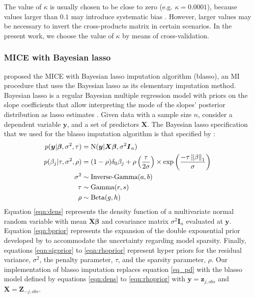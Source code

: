 	The value of $\kappa$ is usually chosen to be close to zero (e.g. $\kappa = 0.0001$), because values larger than $0.1$ 
	may introduce systematic bias \citep[p. 68]{vanBuuren:2018}.
	However, larger values may be necessary to invert the cross-products matrix in certain scenarios.
	In the present work, we choose the value of $\kappa$ by means of cross-validation.

\subsubsection{MICE with Bayesian lasso}
	\cite{zhaoLong:2016} proposed the MICE with Bayesian lasso imputation algorithm (blasso), an MI procedure that uses the Bayesian lasso as its elementary imputation method.
	Bayesian lasso is a regular Bayesian multiple regression model with priors on the slope coefficients 
	that allow interpreting the mode of the slopes' posterior distribution as lasso estimates 
	\citep{parkCasella:2008, hans:2009}.
	Given data with a sample size $n$, consider a dependent variable $\bm{y}$, and a set of predictors $\bm{X}$.
	The Bayesian lasso specification that we used for the blasso imputation algorithm is that specified 
	by \cite{hans:2010}:
%
	\begin{align}
		p(\bm{y}|\bm{\beta}, \sigma^2, \tau) &= \textrm{N}(\bm{y}|\bm{X\beta}, \sigma^2\bm{I}_n) \label{eqn:dens} \\
		p(\beta_j|\tau, \sigma^2, \rho) &= 
			(1 - \rho) \delta_0 \beta_j +
			\rho \left( \frac{\tau}{2\sigma} \right) \times 
			\textrm{exp} \left( \frac{-\tau \norm{\beta}_1}{\sigma} \right) \label{eqn:bprior} \\
		\sigma^2 &\sim \textrm{Inverse-Gamma}(a, b) \label{eqn:sigprior} \\
		\tau &\sim \textrm{Gamma}(r, s) \label{eqn:tauprior} \\
		\rho &\sim \textrm{Beta}(g, h) \label{eqn:rhoprior}
	\end{align}
%	
	Equation \eqref{eqn:dens} represents the density function of a multivariate normal random variable 
	with mean $\bm{X\beta}$ and covariance matrix $\sigma^2\bm{I}_n$ evaluated at $\bm{y}$.
	Equation \eqref{eqn:bprior} represents the expansion of the \cite{parkCasella:2008} double exponential 
	prior developed by \cite{hans:2010} to accommodate the uncertainty regarding model sparsity.
	Finally, equations \eqref{eqn:sigprior} to \eqref{eqn:rhoprior} represent hyper priors for the residual variance, 
	$\sigma^2$, the penalty parameter, $\tau$, and the sparsity parameter, $\rho$.
	Our implementation of blasso imputation replaces equation \eqref{eq_pd} with the blasso model defined by equations \eqref{eqn:dens} to \eqref{eqn:rhoprior} with $\bm{y} = \bm{z}_{j,obs}$ and $\bm{X} = \bm{Z}_{-j,obs}$.

